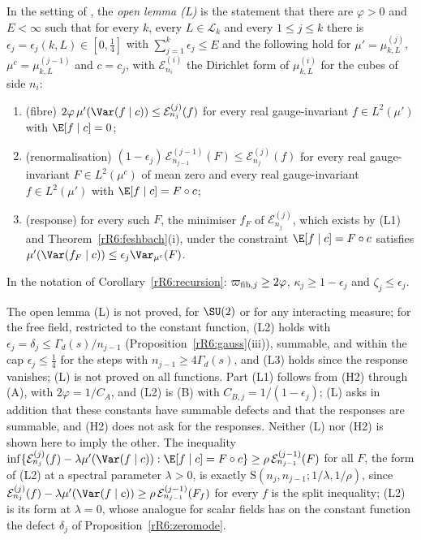 \begin{definition}
\label{rR6:lemmaL}
In the setting of \cite[Corollary~102]{BBLR26}, the \emph{open lemma
\textup{(L)}} is the statement that there are $\varphi>0$ and $E<\infty$
such that for every $k$, every $L\in\mathcal L_k$ and every $1\le j\le k$
there is $\epsilon_j=\epsilon_j(k,L)\in[0,\frac14]$ with $\sum_{j=1}^k
\epsilon_j\le E$ and the following hold for $\mu'=\mu^{(j)}_{k,L}$,
$\mu^c=\mu^{(j-1)}_{k,L}$ and $c=c_j$, with $\mathcal E^{(i)}_{n_i}$ the
Dirichlet form of $\mu^{(i)}_{k,L}$ for the cubes of side $n_i$:
\begin{enumerate}[label=\textup{(L\arabic*)},leftmargin=*]
\item (fibre) $2\varphi\,\mu'(\Var(f\mid c))\le\mathcal E^{(j)}_{n_j}(f)$
for every real gauge-invariant $f\in L^2(\mu')$ with $\E[f\mid c]=0$;
\item (renormalisation) $(1-\epsilon_j)\,\mathcal E^{(j-1)}_{n_{j-1}}(F)
\le\mathcal E^{(j)}_{n_j}(f)$ for every real gauge-invariant $F\in L^2
(\mu^c)$ of mean zero and every real gauge-invariant $f\in L^2(\mu')$ with
$\E[f\mid c]=F\circ c$;
\item (response) for every such $F$, the minimiser $f_F$ of $\mathcal
E^{(j)}_{n_j}$, which exists by (L1) and Theorem~\ref{rR6:feshbach}(i),
under the constraint $\E[f\mid c]=F\circ c$ satisfies
$\mu'(\Var(f_F\mid c))\le\epsilon_j\Var_{\mu^c}(F)$.
\end{enumerate}
In the notation of Corollary~\ref{rR6:recursion}: $\varpi_{{\rm fib},j}\ge
2\varphi$, $\kappa_j\ge1-\epsilon_j$ and $\zeta_j\le\epsilon_j$.
\end{definition}

The open lemma (L) is not proved, for $\SU(2)$ or for any interacting
measure; for the free field, restricted to the constant function, (L2) holds with
$\epsilon_j=\delta_j\le\Gamma_d(s)/n_{j-1}$
(Proposition~\ref{rR6:gauss}(iii)), summable, and within the cap
$\epsilon_j\le\frac14$ for the steps with $n_{j-1}\ge4\Gamma_d(s)$, and
(L3) holds since the response vanishes; (L) is not proved on all
functions. Part
(L1) follows from (H2) through (A), with $2\varphi=1/C_A$, and (L2) is (B) with $C_{B,j}=1/(1-
\epsilon_j)$; (L) asks in addition that these constants have summable
defects and that the responses are summable, and (H2) does not ask for
the responses. Neither (L) nor (H2) is shown here to imply the other. The
inequality $\inf\{\mathcal E^{(j)}_{n_j}(f)-\lambda\mu'(\Var(f\mid c)):\E[f
\mid c]=F\circ c\}\ge\rho\,\mathcal E^{(j-1)}_{n_{j-1}}(F)$ for all $F$, the
form of (L2) at a spectral parameter $\lambda>0$, is exactly $\mathrm S(n_j,
n_{j-1};1/\lambda,1/\rho)$, since $\mathcal E^{(j)}_{n_j}(f)-\lambda\mu'
(\Var(f\mid c))\ge\rho\,\mathcal E^{(j-1)}_{n_{j-1}}(F_f)$ for every $f$ is
the split inequality; (L2) is its form at $\lambda=0$, whose analogue for
scalar fields has on the constant function the defect $\delta_j$ of
Proposition~\ref{rR6:zeromode}.

